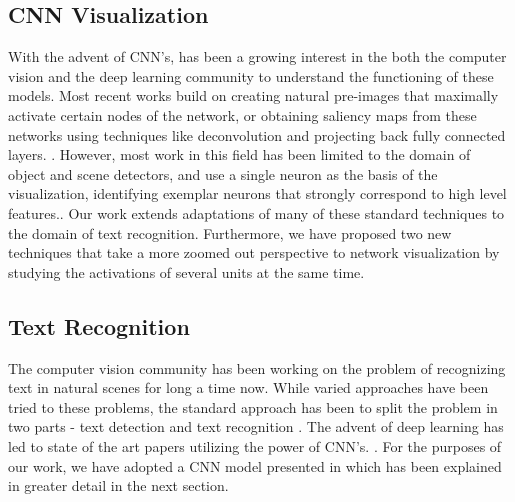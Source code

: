 \documentclass[10pt,twocolumn,letterpaper]{article}
\begin{document}
\subsection{CNN Visualization}
With the advent of CNN's, has been a growing interest in the both the computer vision and the deep learning community to understand the functioning of these models. Most recent works build on creating natural pre-images \cite{DBLP:journals/corr/MahendranV15} that maximally activate certain nodes of the network, or obtaining saliency maps from these networks using techniques like deconvolution \cite{DBLP:journals/corr/ZeilerF13} and
projecting back fully connected layers. \cite{DBLP:journals/corr/SimonyanVZ13}. However, most work in this field has been limited to the domain of object and scene detectors, and use a single neuron as the basis of the visualization, identifying exemplar neurons that strongly correspond to high level features.\cite{zhou2014object,DBLP:journals/corr/GirshickDDM13,DBLP:journals/corr/MahendranV15,DBLP:journals/corr/ZeilerF13,DBLP:journals/corr/SimonyanVZ13,mahendran2015understanding}. Our work extends adaptations of many of these standard techniques \cite{yosinski2015understanding} to the domain of text recognition. Furthermore, we have proposed two new techniques that take a more zoomed out perspective to network visualization by studying the activations of several units at the same time.


\subsection{Text Recognition}


The computer vision community has been working on the problem of recognizing text in natural scenes for long a time now\cite{1315187}. While varied approaches have been tried to these problems, the standard approach has been to split the problem in two parts - text detection and text recognition \cite{PosnerEtAl-IROS2010,Neumann:2011:TLR:2066306.2067476,Yang:2014:FIV:2583855.2583972,6751121,KaiWang:2011:EST:2355573.2356398,Weinman:2014:TIS:2574225.2574484,DBLP:journals/corr/AlsharifP13,6751207}. The advent of deep learning has led to state of the art papers utilizing the power of CNN's. \cite{Jaderberg14,Jaderberg14d,Gupta16,6460871}. For the purposes of our work, we have adopted a CNN model presented in \cite{Jaderberg14c} which has been explained in greater detail in the next section.
\end{document}
